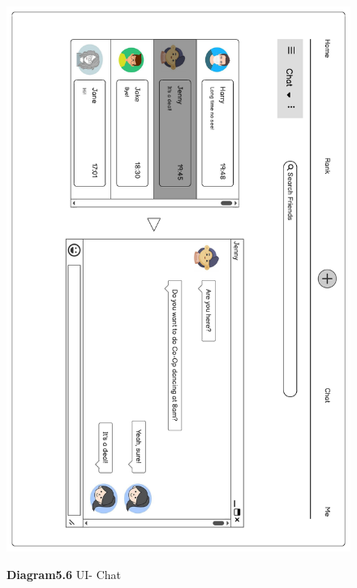 \documentclass[a4paper]{article}
\begin{document}
	\begin{figure}[H]
		\centering
		\caption*{\textbf{Diagram5.6} UI- Chat}
		\includegraphics[width=1\textwidth]{images/UI_Final/UI_Final_6.pdf}
		\label{UI_6}
	\end{figure}
\end{document}
